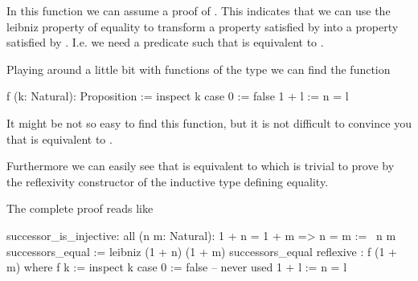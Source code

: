 In this function we can assume a proof of . This indicates
that we can use the leibniz property of equality to transform a property
satisfied by  into a property satisfied by .  I.e. we
need a predicate  such that  is equivalent to .

Playing around a little bit with functions of the type  we can find the function

\begin{alba}
    f (k: Natural): Proposition :=
        inspect k case
            0     := false
            1 + l := n = l
\end{alba}

It might be not so easy to find this function, but it is not difficult to
convince you that  is equivalent to .

Furthermore we can easily see that  is equivalent to  which is trivial to prove by the reflexivity constructor of the inductive
type defining equality.

The complete proof reads like

\begin{alba}
    successor_is_injective:
        all (n m: Natural): 1 + n = 1 + m => n = m
    :=
        \ n m successors_equal :=
            leibniz (1 + n) (1 + m) successors_equal reflexive
                : f (1 + m)
            where
                f k :=
                    inspect k case
                        0     := false  -- never used
                        1 + l := n = l
\end{alba}


